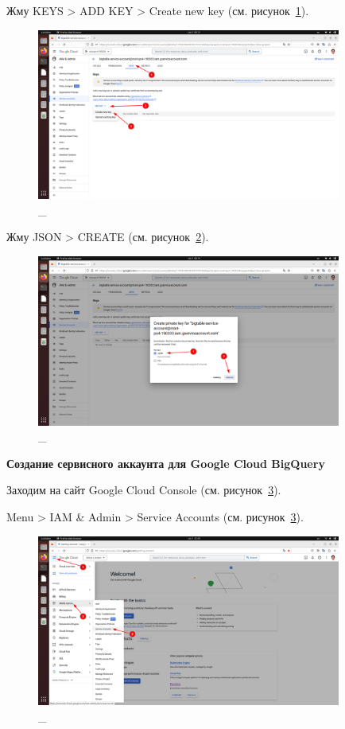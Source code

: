 \documentclass[12pt, a4paper, simple]{eskdtext}
\begin{document}
  Жму KEYS > ADD KEY > Create new key (см. рисунок~\ref{fig:15}).

  \begin{figure}[!h]
    \centering
    \includegraphics[width=10cm]
    {images/GoogleCloudBigTable/2023-03-01_08-14-23.png}
    \caption{\_}
    \label{fig:15}
  \end{figure}

  Жму JSON > CREATE (см. рисунок~\ref{fig:16}).

  \begin{figure}[!h]
    \centering
    \includegraphics[width=10cm]
    {images/GoogleCloudBigTable/2023-03-01_08-14-41.png}
    \caption{\_}
    \label{fig:16}
  \end{figure}

  \newpage
  \begin{center}
    \textbf{Создание сервисного аккаунта для Google Cloud BigQuery}
  \end{center}

  Заходим на сайт Google Cloud Console \cite{GoogleCloudConsole} (см. рисунок~\ref{fig:17}).

  Menu > IAM \& Admin > Service Accounts \cite{GoogleCloudServiceAccounts} (см. рисунок~\ref{fig:17}).

  \begin{figure}[!h]
    \centering
    \includegraphics[width=10cm]
    {images/GoogleCloudBigQuery/2023-03-01_22-10-20.png}
    \caption{\_}
    \label{fig:17}
  \end{figure}
\end{document}
